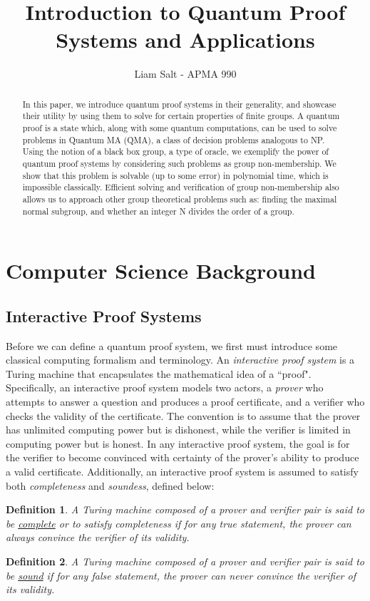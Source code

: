 \documentclass[12pt]{article}
\title{Introduction to Quantum Proof Systems and Applications}
\author{Liam Salt - APMA 990}
\newtheorem*{defn}{Definition}
\begin{document}
	\maketitle
	\tableofcontents
	\begin{abstract}
		In this paper, we introduce quantum proof systems in their generality, and showcase their utility by using them to solve for certain properties of finite groups. A quantum proof is a state which, along with some quantum computations, can be used to solve problems in Quantum MA (QMA),  a class of decision problems analogous to NP. Using the notion of a black box group, a type of oracle, we exemplify the power of quantum proof systems by considering such problems as group non-membership. We show that this problem is solvable (up to some error) in polynomial time, which is impossible classically. Efficient solving and verification of group non-membership also allows us to approach other group theoretical problems such as: finding the maximal normal subgroup, and whether an integer N divides the order of a group.
	\end{abstract}
	\section{Computer Science Background}
	
	\subsection{Interactive Proof Systems}
	
	Before we can define a quantum proof system, we first must introduce some classical computing formalism and terminology. An \textit{interactive proof system} is a Turing machine that encapsulates the mathematical idea of a ``proof". Specifically, an interactive proof system models two actors, a \textit{prover} who attempts to answer a question and produces a proof certificate, and a verifier who checks the validity of the certificate. The convention is to assume that the prover has unlimited computing power but is dishonest, while the verifier is limited in computing power but is honest. In any interactive proof system, the goal is for the verifier to become convinced with certainty of the prover's ability to produce a valid certificate. Additionally, an interactive proof system is assumed to satisfy both \textit{completeness} and \textit{soundess}, defined below:
	\begin{defn}
		A Turing machine composed of a prover and verifier pair is said to be \underline{complete} or to satisfy completeness if for any true statement, the prover can always convince the verifier of its validity.
	\end{defn}
	\begin{defn} A Turing machine composed of a prover and verifier pair is said to be \underline{sound} if for any false statement, the prover can never convince the verifier of its validity.
	\end{defn}
\end{document}

